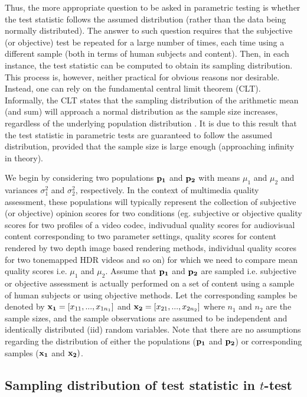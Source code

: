 \documentclass[10pt,final,Twcolumn]{IEEEtran}
\begin{document}
Thus, the more appropriate question to be asked in parametric testing is whether the test statistic follows the assumed distribution (rather than the data being normally distributed). The answer to such question requires that the subjective (or objective) test be repeated for a large number of times, each time using a different sample (both in terms of human subjects and content). Then, in each instance, the test statistic can be computed to obtain its sampling distribution.  This process is, however, neither practical for obvious reasons nor desirable. Instead, one can rely on the fundamental central limit theorem (CLT). Informally, the CLT states that the sampling distribution of the arithmetic mean (and sum) will approach a normal distribution as the sample size increases, regardless of the underlying population distribution \cite{PFLUG1983323}. It is due to this result that the test statistic in parametric tests are guaranteed to follow the assumed distribution, provided that the sample size is large enough (approaching infinity in theory). 

We begin by considering two populations ${\it\bf  {p_1}}$ and ${\it\bf  {p_2}}$ with means $\mu_1$ and $\mu_2$ and variances $\sigma_1^2$ and $\sigma_2^2$, respectively. In the context of multimedia quality assessment, these populations will typically represent the collection of subjective (or objective) opinion scores for two conditions (eg. subjective or objective quality scores for two profiles of a video codec, indivudual quality scores for audiovisual content corresponding to two parameter settings, quality scores for content rendered by two depth image based rendering methods, individual quality scores for two tonemapped HDR videos and so on) for which we need to compare mean quality scores i.e. $\mu_1$ and $\mu_2$. Assume that ${\it\bf  {p_1}}$ and ${\it\bf  {p_2}}$ are sampled i.e. subjective or objective assessment is actually performed on a set of content using a sample of human subjects or using objective methods. Let the corresponding samples be denoted by ${\it\bf  {x_1}} = [x_{11},...,x_{1n_1}]$ and ${\it\bf  {x_2}} = [x_{21},...,x_{2n_2}]$ where $n_1$ and $n_2$ are the sample sizes, and the sample observations are assumed to be independent and identically distributed (iid) random variables. Note that there are no assumptions regarding the distribution of either the populations (${\it\bf  {p_1}}$ and ${\it\bf  {p_2}}$) or corresponding samples (${\it\bf  {x_1}}$ and ${\it\bf  {x_2}})$.

\subsection{Sampling distribution of test statistic in $t$-test}
\end{document}
